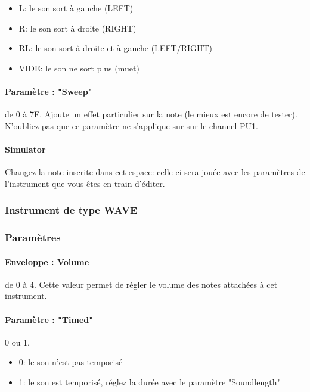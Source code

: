 \begin{itemize}
    \item{L: le son sort à gauche (LEFT)}
    \item{R: le son sort à droite (RIGHT)}
    \item{RL: le son sort à droite et à gauche (LEFT/RIGHT)}
    \item{VIDE: le son ne sort plus (muet)}
\end{itemize}

\paragraph{Paramètre : "Sweep"} de 0 à 7F.
Ajoute un effet particulier sur la note (le mieux est encore de tester).
N'oubliez pas que ce paramètre ne s'applique sur sur le channel PU1.

\paragraph{Simulator} Changez la note inscrite dans cet espace:
        celle-ci sera jouée avec les paramètres de l'instrument que vous êtes en train d'éditer.

\subsubsection{Instrument de type WAVE}


\subsubsection{Paramètres}

\paragraph{Enveloppe : Volume} de 0 à 4.
Cette valeur permet de régler le volume des notes attachées à cet instrument.

\paragraph{Paramètre : "Timed"} 0 ou 1.
\medskip

\begin{itemize}
        \item{0: le son n'est pas temporisé}
        \item{1: le son est temporisé, réglez la durée avec le paramètre "Soundlength"}
    \end{itemize}

